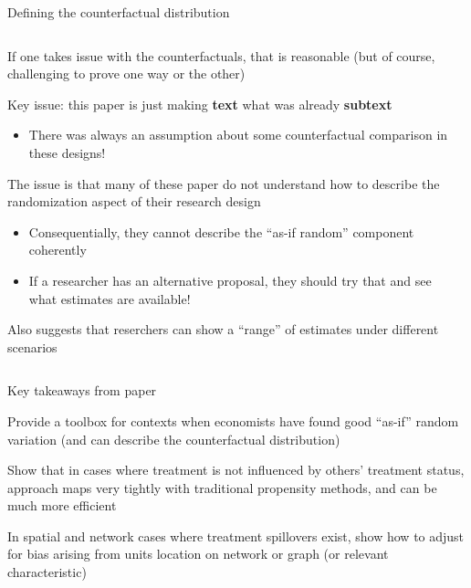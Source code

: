 \documentclass[notes,11pt, aspectratio=169]{beamer}
\newenvironment{wideitemize}{\itemize\addtolength{\itemsep}{10pt}}{\enditemize}
\begin{document}
\begin{frame}{ Defining the counterfactual distribution}
\begin{columns}[T] %
\begin{column}{.9\textwidth}
  \begin{wideitemize}
  \item If one takes issue with the counterfactuals, that is
    reasonable (but of course, challenging to prove one way or the other)
  \item Key issue: this paper is just making \textbf{text} what was
    already \textbf{subtext}
    \begin{itemize}
    \item There was always an assumption about some counterfactual comparison in these designs!
    \end{itemize}
  \item The issue is that many of these paper do not understand how to describe the randomization aspect of their research design
    \begin{itemize}
    \item Consequentially, they cannot describe the ``as-if random''
      component coherently
    \item If a researcher has an alternative proposal, they should try that and see what estimates are available!
    \end{itemize}
  \item Also suggests that reserchers can show a ``range'' of
    estimates under different scenarios
  \end{wideitemize}
\end{column}%
\hfill%
\begin{column}{.45\textwidth}
\end{column}%
\end{columns}
\end{frame}


\begin{frame}{Key takeaways from paper}
  \begin{wideitemize}
  \item Provide a toolbox for contexts when economists have found good
    ``as-if'' random variation (and can describe the counterfactual
    distribution)
  \item Show that in cases where treatment is not influenced by
    others' treatment status, approach maps very tightly with
    traditional propensity methods, and can be much more efficient
  \item In spatial and network cases where treatment spillovers exist,
    show how to adjust for bias arising from units location on network
    or graph (or relevant characteristic)
  \end{wideitemize}
\end{frame}
\end{document}
